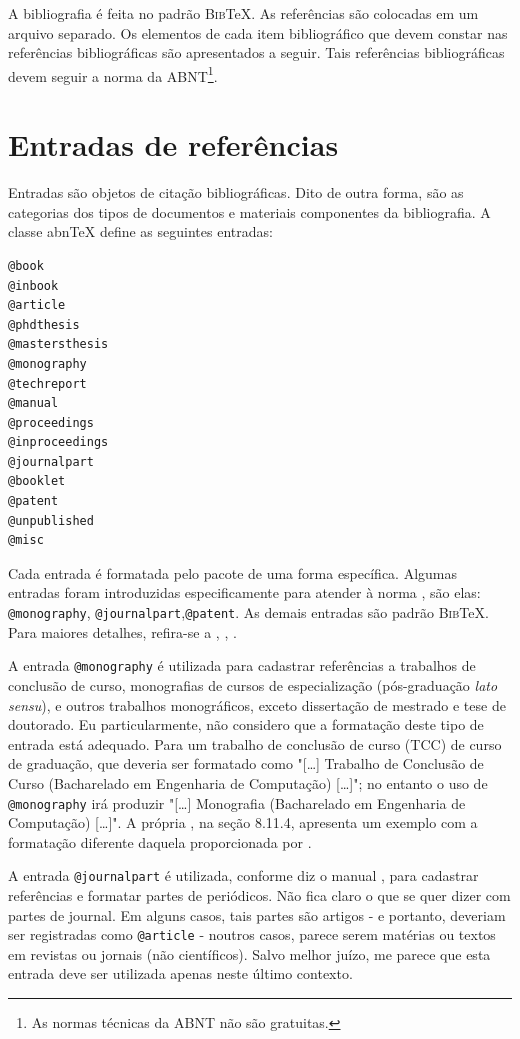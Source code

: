 \begin{apendicesenv}
A bibliografia é feita no padrão \textsc{Bib}\TeX{}. As referências são
colocadas em um arquivo separado. Os elementos de cada item bibliográfico que
devem constar nas referências bibliográficas são apresentados a seguir. Tais 
referências bibliográficas devem seguir a norma  da
ABNT\footnote{As normas técnicas da ABNT não são gratuitas.}.

\section{Entradas de referências}
\label{sec:entradasRefs}

Entradas são objetos de citação bibliográficas. Dito de outra forma, são as
categorias dos tipos de documentos e materiais componentes da bibliografia. A
classe abn\TeX{} define as seguintes entradas:

\begin{verbatim}
@book
@inbook
@article
@phdthesis
@mastersthesis
@monography
@techreport
@manual
@proceedings
@inproceedings
@journalpart
@booklet
@patent
@unpublished
@misc
\end{verbatim}

Cada entrada é formatada pelo pacote  de uma forma
específica. Algumas entradas foram introduzidas especificamente para atender à
norma , são elas: \verb|@monography|,
\verb|@journalpart|,\verb|@patent|. As demais entradas são padrão
\textsc{Bib}\TeX{}. Para maiores detalhes, refira-se a
, , .

A entrada \verb|@monography| é utilizada para cadastrar referências a trabalhos
de conclusão de curso, monografias de cursos de especialização (pós-graduação
\textit{lato sensu}), e outros trabalhos monográficos, exceto dissertação de
mestrado e tese de doutorado. Eu particularmente, não considero que a formatação
deste tipo de entrada está adequado. Para um trabalho de conclusão de curso
(TCC) de curso de graduação, que deveria ser formatado como
"[\ldots] Trabalho de Conclusão de Curso (Bacharelado em Engenharia de Computação) [\ldots]"{};
no entanto o uso de \verb|@monography| irá produzir
"[\ldots] Monografia (Bacharelado em Engenharia de Computação) [\ldots]"{}.
A própria  , na seção 8.11.4, apresenta um exemplo com
a formatação diferente daquela proporcionada por .

A entrada \verb|@journalpart| é utilizada, conforme diz o manual
\cite{abnTeX22014d}, para cadastrar referências e formatar partes de periódicos.
Não fica claro o que se quer dizer com partes de journal. Em alguns casos, tais
partes são artigos - e portanto, deveriam ser registradas como \verb|@article| -
noutros casos, parece serem matérias ou textos em revistas ou jornais (não
científicos). Salvo melhor juízo, me parece que esta entrada deve ser utilizada
apenas neste último contexto.


\end{apendicesenv}
